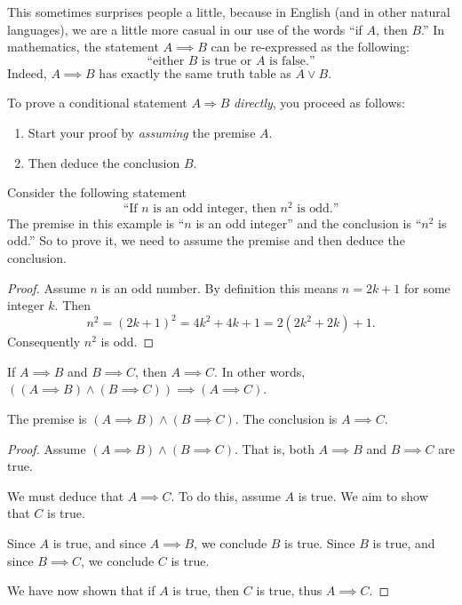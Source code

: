 \documentclass[11pt,dvipsnames]{book}
\numberwithin{figure}{section} %
\numberwithin{table}{section} %
\begin{document}
This sometimes surprises people a little, because in English (and in other natural languages), we are a little more casual in our use of the words ``if $A$, then $B$.''
In mathematics, the statement $A \implies B$ can be re-expressed as the following:
\[
    \text{``either $B$ is true or $A$ is false.''}
\]
Indeed, $A \implies B$ has exactly the same truth table as $\overline{A} \vee B$.

To prove a conditional statement $A\Longrightarrow B$ \emph{directly}, you proceed as follows:
\begin{enumerate}[label=(\alph*)]
\item Start your proof by \emph{assuming} the premise $A$.
\item Then deduce the conclusion $B$.
\end{enumerate}

\begin{example}
Consider the following statement
\[
\text{``If $n$ is an odd integer, then $n^2$ is odd.''}
\]
The premise in this example is ``$n$ is an odd integer'' and the conclusion is ``$n^2$ is odd.''
So to prove it, we need to assume the premise and then deduce the conclusion.
\begin{proof}
Assume $n$ is an odd number.
By definition this means $n=2k+1$ for some integer $k$.
Then
\[
n^2=(2k+1)^2=4k^2+4k+1=2(2k^2+2k)+1.
\]
Consequently $n^2$ is odd.
\end{proof}
\end{example}

\begin{example}
If $A\implies B$ and $B\implies C$, then $A\implies C$.
In other words, $((A \implies B) \wedge (B \implies C)) \implies (A \implies C)$.

The premise is $(A\implies B)\wedge(B\implies C)$.
The conclusion is $A\implies C$.
\begin{proof}
Assume $(A\implies B)\wedge(B\implies C)$.
That is, both $A \implies B$ and $B \implies C$ are true.

We must deduce that $A\implies C$.
To do this, assume $A$ is true.
We aim to show that $C$ is true.

Since $A$ is true, and since $A\implies B$, we conclude $B$ is true.
Since $B$ is true, and since $B\implies C$, we conclude $C$ is true.

We have now shown that if $A$ is true, then $C$ is true, thus $A\implies C$.
\end{proof}
\end{example}
\end{document}

